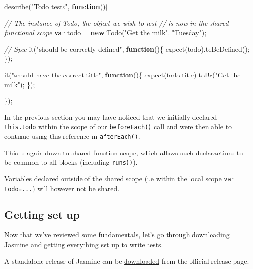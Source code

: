 \documentclass[9pt]{book}
\newenvironment{Shaded}{}{}
\newcommand{\KeywordTok}[1]{\textcolor[rgb]{0.00,0.44,0.13}{\textbf{{#1}}}}
\newcommand{\StringTok}[1]{\textcolor[rgb]{0.25,0.44,0.63}{{#1}}}
\newcommand{\CommentTok}[1]{\textcolor[rgb]{0.38,0.63,0.69}{\textit{{#1}}}}
\newcommand{\OtherTok}[1]{\textcolor[rgb]{0.00,0.44,0.13}{{#1}}}
\newcommand{\FunctionTok}[1]{\textcolor[rgb]{0.02,0.16,0.49}{{#1}}}
\newcommand{\NormalTok}[1]{{#1}}
\begin{document}
\begin{Shaded}
\begin{Highlighting}[]
\FunctionTok{describe}\NormalTok{(}\StringTok{"Todo tests"}\NormalTok{, }\KeywordTok{function}\NormalTok{()\{}
    
    \CommentTok{// The instance of Todo, the object we wish to test}
    \CommentTok{// is now in the shared functional scope}
    \KeywordTok{var} \NormalTok{todo = }\KeywordTok{new} \FunctionTok{Todo}\NormalTok{(}\StringTok{"Get the milk"}\NormalTok{, }\StringTok{"Tuesday"}\NormalTok{);}

    \CommentTok{// Spec}
    \FunctionTok{it}\NormalTok{(}\StringTok{"should be correctly defined"}\NormalTok{, }\KeywordTok{function}\NormalTok{()\{}
        \FunctionTok{expect}\NormalTok{(todo).}\FunctionTok{toBeDefined}\NormalTok{();}
    \NormalTok{\});}

    \FunctionTok{it}\NormalTok{(}\StringTok{"should have the correct title"}\NormalTok{, }\KeywordTok{function}\NormalTok{()\{}
        \FunctionTok{expect}\NormalTok{(}\OtherTok{todo}\NormalTok{.}\FunctionTok{title}\NormalTok{).}\FunctionTok{toBe}\NormalTok{(}\StringTok{"Get the milk"}\NormalTok{);}
    \NormalTok{\});}

\NormalTok{\});}
\end{Highlighting}
\end{Shaded}

In the previous section you may have noticed that we initially declared
\texttt{this.todo} within the scope of our \texttt{beforeEach()} call
and were then able to continue using this reference in
\texttt{afterEach()}.

This is again down to shared function scope, which allows such
declaractions to be common to all blocks (including \texttt{runs()}).

Variables declared outside of the shared scope (i.e within the local
scope \texttt{var todo=...}) will however not be shared.

\subsection{Getting set up}\label{getting-set-up-1}

Now that we've reviewed some fundamentals, let's go through downloading
Jasmine and getting everything set up to write tests.

A standalone release of Jasmine can be
\href{https://github.com/pivotal/jasmine/releases/}{downloaded} from the
official release page.
\end{document}
